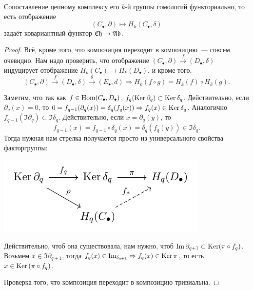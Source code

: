     \begin{lemma}
        Сопоставление цепному комплексу его $k$-й группы гомологий функториально, то есть отображение
        \[ (C_{\bullet}, \partial) \mapsto H_{k}(C_{\bullet}, \delta) \]
        задаёт ковариантный функтор $\mathfrak{C}\mathfrak{h} \to \mathfrak{A}\mathfrak{b}$.
    \end{lemma}
    \begin{proof}
        Всё, кроме того, что композиция переходит в композицию~--- совсем очевидно.
        Нам надо проверить, что отображение $(C_{\bullet}, \partial) \xrightarrow{f} (D_{\bullet}, \delta)$ индуцирует отображение
        $H_{k}(C_{\bullet}) \to H_{k}(D_{\bullet})$, и кроме того,
        \[ (C_{\bullet}, \partial) \xrightarrow{f} (D_{\bullet}, \delta) \xrightarrow{g} (E_{\bullet}, d) \Rightarrow H_{k}(f \circ g) = H_{k}(f) \circ H_{k}(g).\]

        Заметим, что так как $f \in \operatorname{Hom}(C_{\bullet}, D_{\bullet})$, $f_{q}(\operatorname{Ker}{\partial_{q}}) \subset \operatorname{Ker}{\delta_{q}}$.
        Действительно, если $\partial_{q}(x) = 0$, то $0 = f_{q - 1}(\partial_{q}(x)) = \delta_{q}(f_{q}(x)) \Rightarrow f_{q}(x) \in \operatorname{Ker}{\delta_{q}}$.
        Аналогично $f_{q - 1}(\Im{\partial_{q}}) \subset \Im{\delta_{q}}$. Действительно, если $x = \partial_{q}(y)$, то
        \[ f_{q - 1}(x) = f_{q - 1} \circ \delta_{q}(x) = \delta_{q}(f_{q}(y)) \in \Im{\delta_{q}}. \]
        Тогда нужная нам стрелка получается просто из универсального свойства факторгруппы:
        \begin{center}
            \includegraphics{lectures/0/pictures/cd_2}
        \end{center}
        Действительно, чтоб она существовала, нам нужно, чтоб $\mathop{\mathrm{Im}}\nolimits{\partial_{q + 1}} \subset \operatorname{Ker}(\pi \circ f_{q})$. Возьмем $x \in \Im{\partial_{q + 1}}$, тогда
        $f_{q}(x) \in \mathop{\mathrm{Im}}\nolimits_{\delta_{q + 1}} \Rightarrow f_{q}(x) \in \operatorname{Ker}{\pi}$, то есть $x \in \operatorname{Ker}{(\pi \circ f_{q})}$.

        Проверка того, что композиция переходит в композицию тривиальна.
    \end{proof}
    
